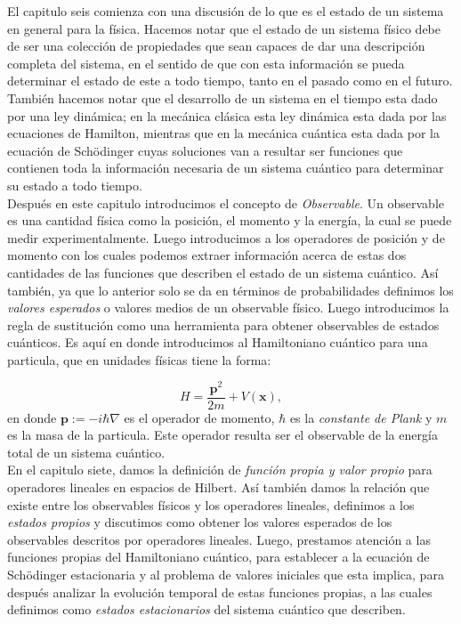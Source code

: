 \documentclass[12pt]{book}
\numberwithin{equation}{chapter}
\def\x{\mathbf{x}}
\def\P{\mathbf{p}}
\begin{document}
El capitulo seis comienza con una discusi\'on de lo que es el estado de un sistema en general para la f\'isica. Hacemos notar que el estado de un sistema f\'isico debe de ser una colecci\'on de propiedades que sean capaces de dar una descripci\'on completa del sistema, en el sentido de que con esta informaci\'on se pueda determinar el estado de este a todo tiempo, tanto en el pasado como en el futuro. Tambi\'en hacemos notar que el desarrollo de un sistema en el tiempo esta dado por una ley din\'amica; en la mec\'anica cl\'asica esta ley din\'amica esta dada por las ecuaciones de Hamilton, mientras que en la mec\'anica cu\'antica esta dada por la ecuaci\'on de Sch\"odinger cuyas soluciones van a resultar ser funciones que contienen toda la informaci\'on necesaria de un sistema cu\'antico para determinar su estado a todo tiempo. \\
Despu\'es en este capitulo introducimos el concepto de \emph{Observable}. Un observable es una cantidad f\'isica como la posici\'on, el momento y la energ\'ia, la cual se puede medir experimentalmente. Luego introducimos a los operadores de posici\'on y de momento con los cuales podemos extraer informaci\'on acerca de estas dos cantidades de las funciones que describen el estado de un sistema cu\'antico. As\'i tambi\'en, ya que lo anterior solo se da en t\'erminos de probabilidades definimos los \emph{valores esperados} o valores medios de un observable f\'isico. Luego introducimos la regla de sustituci\'on como una herramienta para obtener observables de estados cu\'anticos. Es aqu\'i en donde introducimos al Hamiltoniano cu\'antico para una particula, que en unidades f\'isicas tiene la forma:

$$ H= \frac{\P^{2}}{2m} +V(\x), $$
en donde $\mathbf{p}:= -i \hbar \nabla$ es el operador de momento, $\hbar$ es la \emph{constante de Plank} y $m$ es la masa de la particula. Este operador resulta ser el observable de la energ\'ia total de un sistema cu\'antico.\\

En el capitulo siete, damos la definici\'on de \emph{funci\'on propia y valor propio} para operadores lineales en espacios de Hilbert. As\'i tambi\'en damos la relaci\'on que existe entre los observables f\'isicos y los operadores lineales, definimos a los \emph{estados propios} y discutimos como obtener los valores esperados de los observables descritos por operadores lineales. Luego, prestamos atenci\'on a las funciones propias del Hamiltoniano cu\'antico, para establecer a la ecuaci\'on de Sch\"odinger estacionaria y al problema de valores iniciales que esta implica, para despu\'es analizar la evoluci\'on temporal de estas funciones propias, a las cuales definimos como \emph{estados estacionarios} del sistema cu\'antico que describen.
\end{document}
